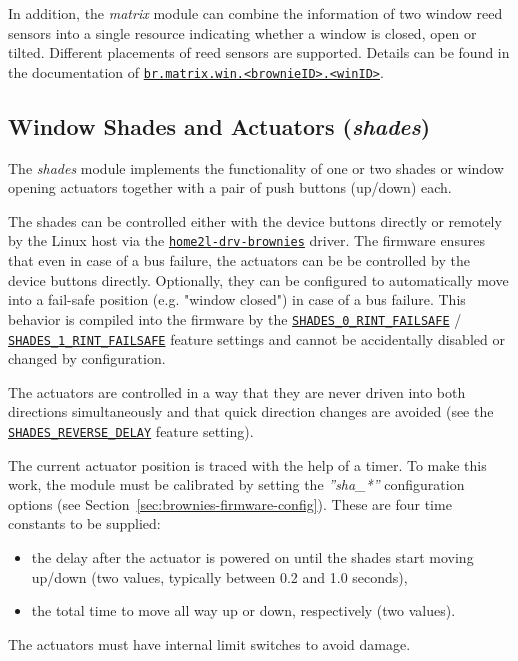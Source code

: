 \documentclass[12pt,english,parskip=half,headheight=19pt]{scrreprt}
\newcommand{\idx}[1]{#1\index{#1}}
\newcommand{\refenv}[1]{\hyperref[env:#1]{\texttt{#1}}}        %
\newcommand{\reftool}[1]{\hyperref[tool:#1]{\texttt{\idx{#1}}}}
\newcommand{\refapic}[1]{\href{home2l-api_c/index.html}{\mbox{\texttt{#1}}}}            %
\begin{document}
In addition, the \textit{matrix} module can combine the information of two window reed sensors into a single resource indicating whether a window is closed, open or tilted. Different placements of reed sensors are supported. Details can be found in the documentation of \refenv{br.matrix.win.<brownieID>.<winID>}.



\subsection{Window Shades and Actuators (\textit{shades})}
\label{sec:brownies-features-shades}

The \textit{shades} module implements the functionality of one or two shades or window opening actuators together with a pair of push buttons (up/down) each.

The shades can be controlled either with the device buttons directly or remotely by the Linux host via the \reftool{home2l-drv-brownies} driver. The firmware ensures that even in case of a bus failure, the actuators can be be controlled by the device buttons directly. Optionally, they can be configured to automatically move into a fail-safe position (e.g. "window closed") in case of a bus failure. This behavior is compiled into the firmware by the \refapic{SHADES\_0\_RINT\_FAILSAFE} / \refapic{SHADES\_1\_RINT\_FAILSAFE} feature settings and cannot be accidentally disabled or changed by configuration.

The actuators are controlled in a way that they are never driven into both directions simultaneously and that quick direction changes are avoided (see the \refapic{SHADES\_REVERSE\_DELAY} feature setting).

The current actuator position is traced with the help of a timer. To make this work, the module must be calibrated by setting the \textit{''sha\_*''} configuration options (see Section~\ref{sec:brownies-firmware-config}). These are four time constants to be supplied:
\begin{itemize}
  \item the delay after the actuator is powered on until the shades start moving up/down 
        (two values, typically between 0.2 and 1.0 seconds),
  \item the total time to move all way up or down, respectively (two values).
\end{itemize}

The actuators must have internal limit switches to avoid damage.
\end{document}
